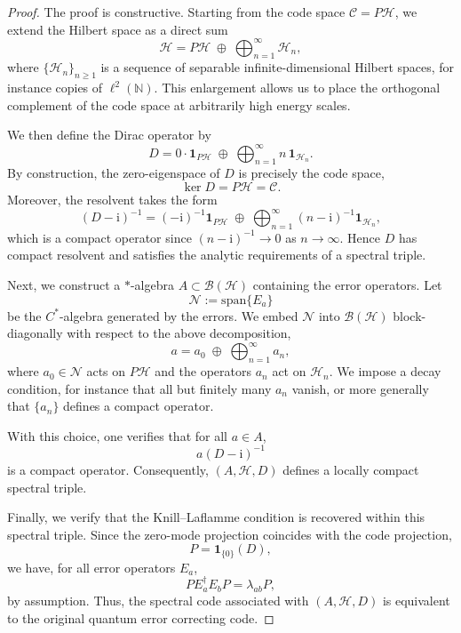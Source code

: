 \documentclass[12pt]{article}
\newcommand{\im}{\mathrm{i}}
\theoremstyle{definition} %
\theoremstyle{plain} %
\theoremstyle{remark} %
\theoremstyle{underline}
\begin{document}
\begin{proof}

The proof is constructive. Starting from the code space $\mathcal{C}=P\mathcal{H}$, we extend the Hilbert space as a direct sum
\[
\mathcal{H}
=
P\mathcal{H}
\;\oplus\;
\bigoplus_{n=1}^{\infty} \mathcal{H}_n,
\]
where $\{\mathcal{H}_n\}_{n\ge 1}$ is a sequence of separable infinite-dimensional Hilbert spaces, for instance copies of $\ell^2(\mathbb{N})$. This enlargement allows us to place the orthogonal complement of the code space at arbitrarily high energy scales.

We then define the Dirac operator by
\[
D
=
0\cdot \mathbf{1}_{P\mathcal{H}}
\;\oplus\;
\bigoplus_{n=1}^{\infty} n\,\mathbf{1}_{\mathcal{H}_n}.
\]
By construction, the zero-eigenspace of $D$ is precisely the code space,
\[
\ker D = P\mathcal{H} = \mathcal{C}.
\]
Moreover, the resolvent takes the form
\[
(D-\im)^{-1}
=
(-\im)^{-1}\mathbf{1}_{P\mathcal{H}}
\;\oplus\;
\bigoplus_{n=1}^{\infty} (n-\im)^{-1}\mathbf{1}_{\mathcal{H}_n},
\]
which is a compact operator since $(n-\im)^{-1}\to 0$ as $n\to\infty$. Hence $D$ has compact resolvent and satisfies the analytic requirements of a spectral triple.


Next, we construct a $*$-algebra $A\subset\mathcal{B}(\mathcal{H})$ containing the error operators. Let
\[
\mathcal{N} := \mathrm{span}\{E_a\}
\]
be the $C^*$-algebra generated by the errors. We embed $\mathcal{N}$ into $\mathcal{B}(\mathcal{H})$ block-diagonally with respect to the above decomposition,
\[
a
=
a_0
\;\oplus\;
\bigoplus_{n=1}^{\infty} a_n,
\]
where $a_0\in\mathcal{N}$ acts on $P\mathcal{H}$ and the operators $a_n$ act on $\mathcal{H}_n$. We impose a decay condition, for instance that all but finitely many $a_n$ vanish, or more generally that $\{a_n\}$ defines a compact operator.

With this choice, one verifies that for all $a\in A$,
\[
a(D-\im)^{-1}
\]
is a compact operator. Consequently, $(A,\mathcal{H},D)$ defines a locally compact spectral triple.


Finally, we verify that the Knill--Laflamme condition is recovered within this spectral triple. Since the zero-mode projection coincides with the code projection,
\[
P = \mathbf{1}_{\{0\}}(D),
\]
we have, for all error operators $E_a$,
\[
P E_a^\dagger E_b P = \lambda_{ab} P,
\]
by assumption. Thus, the spectral code associated with $(A,\mathcal{H},D)$ is equivalent to the original quantum error correcting code.
\end{proof}
\end{document}
